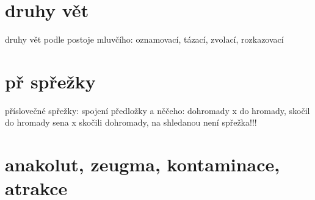 \documentclass{memoir}
\begin{document}
\section*{druhy vět}
druhy vět podle postoje mluvčího: oznamovací, tázací, zvolací, rozkazovací

\section*{př spřežky}
příslovečné spřežky: spojení předložky a něčeho: dohromady x do hromady, skočil do hromady sena x skočili dohromady, na shledanou není spřežka!!!

\section*{anakolut, zeugma, kontaminace, atrakce}
\end{document}
